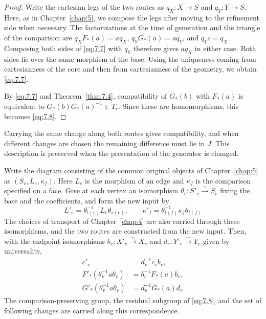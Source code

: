\begin{proof}

Write the cartesian legs of the two routes as $q_X:X\to S$ and $q_Y:Y\to S$.
Here, as in Chapter~\ref{chap:5}, we compose the legs after moving to the refinement side
when necessary.
The factorizations at the time of generation and the triangle of the comparison are
$q_XF_*(a)=aq_X$, $q_YG_*(a)=aq_Y$, and $q_Yc=q_X$.
Composing both sides of \eqref{eq:7.7} with $q_Y$ therefore gives $aq_X$ in either case.
Both sides lie over the same morphism of the base. Using the uniqueness coming from
cartesianness of the core and then from cartesianness of the geometry, we obtain
\eqref{eq:7.7}.

By \eqref{eq:7.7} and Theorem~\ref{thm:7.4}, compatibility of $G_*(b)$ with $F_*(a)$ is
equivalent to $G_*(b)G_*(a)^{-1}\in T_c$.
Since these are homomorphisms, this becomes \eqref{eq:7.8}.

\end{proof}

Carrying the same change along both routes gives compatibility, and when different changes
are chosen the remaining difference must lie in $J$.
This description is preserved when the presentation of the generator is changed.

\begin{proposition}\label{prop:7.7}

Write the diagram consisting of the common original objects of Chapter~\ref{chap:5} as
$(S_v,L_e,\kappa_f)$.
Here $L_e$ is the morphism of an edge and $\kappa_f$ is the comparison specified on a face.
Give at each vertex an isomorphism $\theta_v:S'_v\xrightarrow{\sim}S_v$ fixing the base and
the coefficients, and form the new input by
\begin{equation*}
L'_e=\theta_{t(e)}^{-1}L_e\theta_{s(e)},\qquad
\kappa'_f=\theta_{t(f)}^{-1}\kappa_f\theta_{t(f)}
\tag{7.9}\label{eq:7.9}
\end{equation*}
The choices of transport of Chapter~\ref{chap:4} are also carried through these
isomorphisms, and the two routes are constructed from the new input.
Then, with the endpoint isomorphisms
$b_v:X'_v\xrightarrow{\sim}X_v$ and $d_v:Y'_v\xrightarrow{\sim}Y_v$ given by universality,
\begin{equation*}
\begin{aligned}
c'_v&=d_v^{-1}c_vb_v,\\
F'_*(\theta_v^{-1}a\theta_v)&=b_v^{-1}F_*(a)b_v,\\
G'_*(\theta_v^{-1}a\theta_v)&=d_v^{-1}G_*(a)d_v
\end{aligned}
\tag{7.10}\label{eq:7.10}
\end{equation*}
The comparison-preserving group, the residual subgroup of \eqref{eq:7.8}, and the set of
following changes are carried along this correspondence.

\end{proposition}


